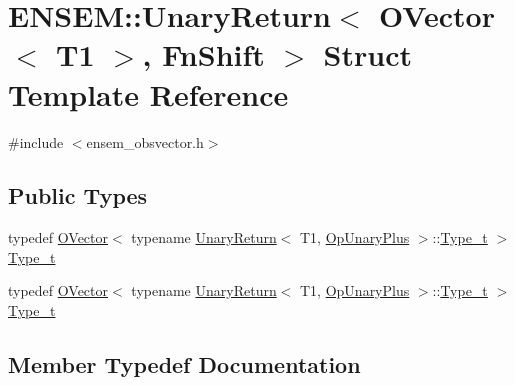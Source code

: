 \hypertarget{structENSEM_1_1UnaryReturn_3_01OVector_3_01T1_01_4_00_01FnShift_01_4}{}\section{E\+N\+S\+EM\+:\+:Unary\+Return$<$ O\+Vector$<$ T1 $>$, Fn\+Shift $>$ Struct Template Reference}
\label{structENSEM_1_1UnaryReturn_3_01OVector_3_01T1_01_4_00_01FnShift_01_4}


{\ttfamily \#include $<$ensem\+\_\+obsvector.\+h$>$}

\subsection*{Public Types}
\begin{DoxyCompactItemize}
\item 
typedef \mbox{\hyperlink{classENSEM_1_1OVector}{O\+Vector}}$<$ typename \mbox{\hyperlink{structENSEM_1_1UnaryReturn}{Unary\+Return}}$<$ T1, \mbox{\hyperlink{structENSEM_1_1OpUnaryPlus}{Op\+Unary\+Plus}} $>$\+::\mbox{\hyperlink{structENSEM_1_1UnaryReturn_3_01OVector_3_01T1_01_4_00_01FnShift_01_4_a45f08020845d964612b7c715afabda12}{Type\+\_\+t}} $>$ \mbox{\hyperlink{structENSEM_1_1UnaryReturn_3_01OVector_3_01T1_01_4_00_01FnShift_01_4_a45f08020845d964612b7c715afabda12}{Type\+\_\+t}}
\item 
typedef \mbox{\hyperlink{classENSEM_1_1OVector}{O\+Vector}}$<$ typename \mbox{\hyperlink{structENSEM_1_1UnaryReturn}{Unary\+Return}}$<$ T1, \mbox{\hyperlink{structENSEM_1_1OpUnaryPlus}{Op\+Unary\+Plus}} $>$\+::\mbox{\hyperlink{structENSEM_1_1UnaryReturn_3_01OVector_3_01T1_01_4_00_01FnShift_01_4_a45f08020845d964612b7c715afabda12}{Type\+\_\+t}} $>$ \mbox{\hyperlink{structENSEM_1_1UnaryReturn_3_01OVector_3_01T1_01_4_00_01FnShift_01_4_a45f08020845d964612b7c715afabda12}{Type\+\_\+t}}
\end{DoxyCompactItemize}


\subsection{Member Typedef Documentation}
\mbox{\label{structENSEM_1_1UnaryReturn_3_01OVector_3_01T1_01_4_00_01FnShift_01_4_a45f08020845d964612b7c715afabda12}} 
